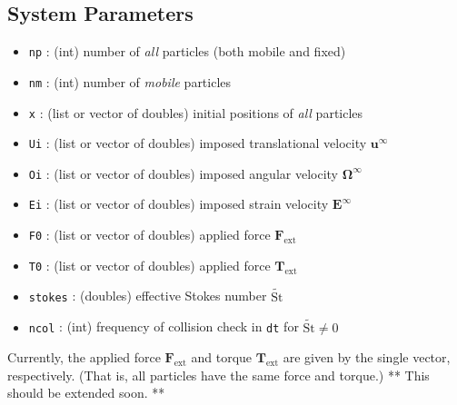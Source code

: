 \documentclass{book}
\begin{document}
\subsection{System Parameters}
\begin{itemize}
\item {\tt np} : (int) number of {\it all} particles (both mobile and fixed)
\item {\tt nm} : (int) number of {\it mobile} particles
\item {\tt x} : (list or vector of doubles)
  initial positions of {\it all} particles
\item {\tt Ui} : (list or vector of doubles)
  imposed translational velocity $\bm{u}^\infty$
\item {\tt Oi} : (list or vector of doubles)
  imposed angular velocity $\bm{\Omega}^\infty$
\item {\tt Ei} : (list or vector of doubles)
  imposed strain velocity $\bm{E}^\infty$
\item {\tt F0} : (list or vector of doubles)
  applied force $\bm{F}_{\text{ext}}$
\item {\tt T0} : (list or vector of doubles)
  applied force $\bm{T}_{\text{ext}}$
\item {\tt stokes} : (doubles) effective Stokes number $\widetilde{\text{St}}$
\item {\tt ncol} : (int) frequency of collision check in
  {\tt dt} for $\widetilde{\text{St}}\neq 0$
\end{itemize}
Currently, the applied force $\bm{F}_{\text{ext}}$
and torque $\bm{T}_{\text{ext}}$ are given by the single vector, respectively.
(That is, all particles have the same force and torque.)
** This should be extended soon. **
\end{document}
